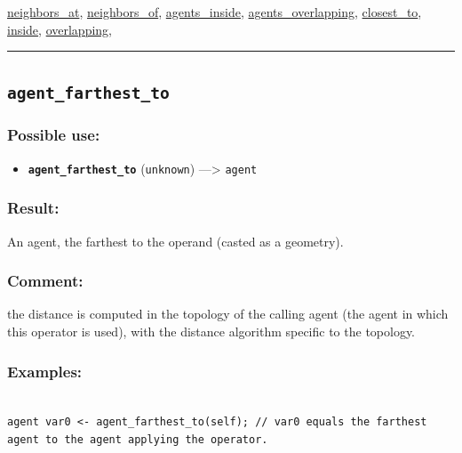 \documentclass[]{book}
\providecommand{\tightlist}{%
  \setlength{\itemsep}{0pt}\setlength{\parskip}{0pt}}
\theoremstyle{definition}
\theoremstyle{definition}
\theoremstyle{definition}
\theoremstyle{remark}
\begin{document}
\href{operators-n-to-r.html\#neighbors_at}{neighbors\_at},
\href{operators-n-to-r.html\#neighbors_of}{neighbors\_of},
\href{operators-a-to-a.html\#agents_inside}{agents\_inside},
\href{operators-a-to-a.html\#agents_overlapping}{agents\_overlapping},
\href{operators-b-to-c.html\#closest_to}{closest\_to},
\href{operators-i-to-m.html\#inside}{inside},
\href{operators-n-to-r.html\#overlapping}{overlapping},

\begin{center}\rule{0.5\linewidth}{\linethickness}\end{center}

\subsection{\texorpdfstring{\texttt{agent\_farthest\_to}}{agent\_farthest\_to}}\label{agent_farthest_to}

\subsubsection{Possible use:}\label{possible-use-27}

\begin{itemize}
\tightlist
\item
  \textbf{\texttt{agent\_farthest\_to}} (\texttt{unknown})
  ---\textgreater{} \texttt{agent}
\end{itemize}

\subsubsection{Result:}\label{result-26}

An agent, the farthest to the operand (casted as a geometry).

\subsubsection{Comment:}\label{comment-5}

the distance is computed in the topology of the calling agent (the agent
in which this operator is used), with the distance algorithm specific to
the topology.

\subsubsection{Examples:}\label{examples-20}

\begin{verbatim}
 
agent var0 <- agent_farthest_to(self); // var0 equals the farthest agent to the agent applying the operator.
\end{verbatim}
\end{document}
